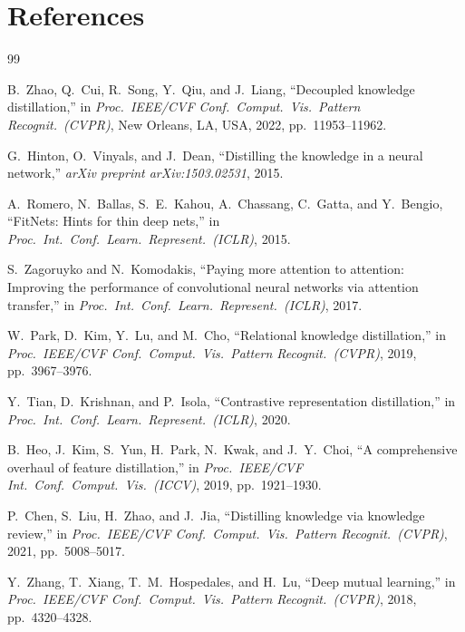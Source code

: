 \documentclass[11pt]{article}
\begin{document}
\section{References}
\label{sec:refs}

\begingroup
\renewcommand{\section}[2]{}%
\begin{thebibliography}{99}

B.~Zhao, Q.~Cui, R.~Song, Y.~Qiu, and J.~Liang, ``Decoupled knowledge distillation,'' in \emph{Proc.\ IEEE/CVF Conf.\ Comput.\ Vis.\ Pattern Recognit.\ (CVPR)}, New Orleans, LA, USA, 2022, pp.\ 11953--11962.

G.~Hinton, O.~Vinyals, and J.~Dean, ``Distilling the knowledge in a neural network,'' \emph{arXiv preprint arXiv:1503.02531}, 2015.

A.~Romero, N.~Ballas, S.~E.~Kahou, A.~Chassang, C.~Gatta, and Y.~Bengio, ``FitNets: Hints for thin deep nets,'' in \emph{Proc.\ Int.\ Conf.\ Learn.\ Represent.\ (ICLR)}, 2015.

S.~Zagoruyko and N.~Komodakis, ``Paying more attention to attention: Improving the performance of convolutional neural networks via attention transfer,'' in \emph{Proc.\ Int.\ Conf.\ Learn.\ Represent.\ (ICLR)}, 2017.

W.~Park, D.~Kim, Y.~Lu, and M.~Cho, ``Relational knowledge distillation,'' in \emph{Proc.\ IEEE/CVF Conf.\ Comput.\ Vis.\ Pattern Recognit.\ (CVPR)}, 2019, pp.\ 3967--3976.

Y.~Tian, D.~Krishnan, and P.~Isola, ``Contrastive representation distillation,'' in \emph{Proc.\ Int.\ Conf.\ Learn.\ Represent.\ (ICLR)}, 2020.

B.~Heo, J.~Kim, S.~Yun, H.~Park, N.~Kwak, and J.~Y.~Choi, ``A comprehensive overhaul of feature distillation,'' in \emph{Proc.\ IEEE/CVF Int.\ Conf.\ Comput.\ Vis.\ (ICCV)}, 2019, pp.\ 1921--1930.

P.~Chen, S.~Liu, H.~Zhao, and J.~Jia, ``Distilling knowledge via knowledge review,'' in \emph{Proc.\ IEEE/CVF Conf.\ Comput.\ Vis.\ Pattern Recognit.\ (CVPR)}, 2021, pp.\ 5008--5017.

Y.~Zhang, T.~Xiang, T.~M.~Hospedales, and H.~Lu, ``Deep mutual learning,'' in \emph{Proc.\ IEEE/CVF Conf.\ Comput.\ Vis.\ Pattern Recognit.\ (CVPR)}, 2018, pp.\ 4320--4328.


\end{thebibliography}
\end{document}
